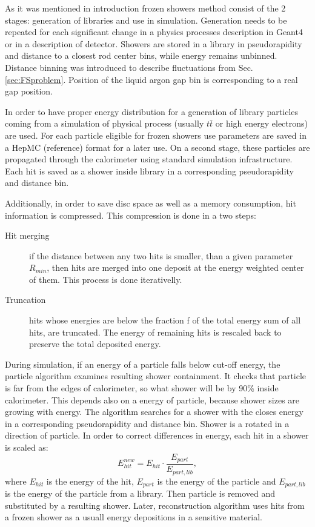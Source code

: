 As it was mentioned in introduction frozen showers method consist of the 2 stages: generation of libraries and use in simulation. Generation needs to be repeated for each significant change in a physics processes description in Geant4 or in a description of detector. Showers are stored in a library in pseudorapidity and distance to a closest rod center bins, while energy remains unbinned. Distance binning was introduced to describe fluctuations from Sec. \ref{sec:FSproblem}. Position of the liquid argon gap bin is corresponding to a real gap position. 

In order to have proper energy distribution for a generation of library particles coming from a simulation of physical process (usually $t\bar{t}$ or high energy electrons) are used. For each particle eligible for frozen showers use parameters are saved in a HepMC (reference) format for a later use. On a second stage, these particles are propagated through the calorimeter using standard \atlas simulation infrastructure. Each hit is saved as a shower inside library in a corresponding pseudorapidity and distance bin. 

Additionally, in order to save disc space as well as a memory consumption, hit information is compressed. This compression is done in a two steps: 
\begin{description}
\item [Hit merging] if the distance between any two hits is smaller, than a given parameter $R_{min}$, then hits are merged into one deposit at the energy weighted center of them. This process is done iterativelly.
\item [Truncation] hits whose energies are below the fraction f of the total energy sum of all hits, are truncated. The energy of remaining hits is rescaled back to preserve the total deposited energy.
\end{description}

During simulation, if an energy of a particle falls below cut-off energy, the particle algorithm examines resulting shower containment. It checks  that particle is far from the edges of calorimeter, so what shower will be by 90\% inside calorimeter. This depends also on a energy of particle, because shower sizes are growing with energy. The algorithm searches for a shower with the closes energy in a corresponding pseudorapidity and distance bin. Shower is a rotated in a direction of particle. In order to correct differences in energy, each hit in a shower is scaled as:
\begin{equation}
E_{hit}^{new}=E_{hit}\cdot \frac{E_{part}}{E_{part,lib}},
\end{equation}
where $E_{hit}$ is the energy of the hit, $E_{part}$ is the energy of the particle and $E_{part,lib}$ is the energy of the particle from a library. Then particle is removed and substituted by a resulting shower. Later, reconstruction algorithm uses hits from a frozen shower as a usuall energy depositions in a sensitive material. 

